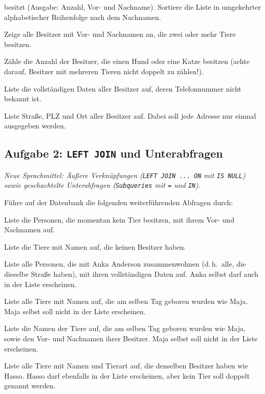 \begin{compactenum}[a)]
besitzt (Ausgabe: Anzahl, Vor- und Nachname). Sortiere die Liste in
umgekehrter alphabetischer Reihenfolge nach dem Nachnamen.
\item Zeige alle Besitzer mit Vor- und Nachnamen an, die zwei oder mehr Tiere
besitzen.
\item Zähle die Anzahl der Besitzer, die einen Hund oder eine Katze besitzen
(achte darauf, Besitzer mit mehreren Tieren nicht doppelt zu zählen!).
\item Liste die vollständigen Daten aller Besitzer auf, deren Telefonnummer
nicht bekannt ist.
\item Liste Straße, PLZ und Ort aller Besitzer auf. Dabei soll jede Adresse nur
einmal ausgegeben werden.
\end{compactenum}

\subsection{Aufgabe 2: \texttt{LEFT JOIN} und Unterabfragen \tagPflicht}
\noindent \emph{Neue Sprachmittel: Äußere Verknüpfungen (\texttt{LEFT JOIN ... ON} mit \texttt{IS NULL}) sowie geschachtelte Unterabfragen (\texttt{Subqueries} mit \texttt{=} und \texttt{IN}).}

Führe auf der Datenbank  die folgenden weiterführenden
Abfragen durch:

\begin{compactenum}[a)]
\item Liste die Personen, die momentan kein Tier besitzen, mit ihrem Vor- und
Nachnamen auf.
\item Liste die Tiere mit Namen auf, die keinen Besitzer haben.
\item Liste alle Personen, die mit Anka Anderson zusammenwohnen (d.\,h.\ alle,
die dieselbe Straße haben), mit ihren vollständigen Daten auf. Anka selbst
darf auch in der Liste erscheinen.
\item Liste alle Tiere mit Namen auf, die am selben Tag geboren wurden wie Maja.
Maja selbst soll nicht in der Liste erscheinen.
\item Liste die Namen der Tiere auf, die am selben Tag geboren wurden wie Maja,
sowie den Vor- und Nachnamen ihrer Besitzer. Maja selbst soll nicht in der
Liste erscheinen.
\item Liste alle Tiere mit Namen und Tierart auf, die denselben Besitzer haben
wie Hasso. Hasso darf ebenfalls in der Liste erscheinen, aber kein Tier soll
doppelt genannt werden.
\end{compactenum}